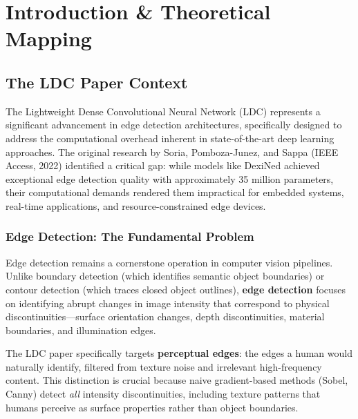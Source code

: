 \documentclass[11pt,a4paper]{report}
\begin{document}

\tableofcontents
\newpage


\chapter{Introduction \& Theoretical Mapping}

\section{The LDC Paper Context}

The Lightweight Dense Convolutional Neural Network (LDC) represents a significant advancement in edge detection architectures, specifically designed to address the computational overhead inherent in state-of-the-art deep learning approaches. The original research by Soria, Pomboza-Junez, and Sappa (IEEE Access, 2022) identified a critical gap: while models like DexiNed achieved exceptional edge detection quality with approximately 35 million parameters, their computational demands rendered them impractical for embedded systems, real-time applications, and resource-constrained edge devices.

\subsection{Edge Detection: The Fundamental Problem}

Edge detection remains a cornerstone operation in computer vision pipelines. Unlike boundary detection (which identifies semantic object boundaries) or contour detection (which traces closed object outlines), \textbf{edge detection} focuses on identifying abrupt changes in image intensity that correspond to physical discontinuities---surface orientation changes, depth discontinuities, material boundaries, and illumination edges.

The LDC paper specifically targets \textbf{perceptual edges}: the edges a human would naturally identify, filtered from texture noise and irrelevant high-frequency content. This distinction is crucial because naive gradient-based methods (Sobel, Canny) detect \textit{all} intensity discontinuities, including texture patterns that humans perceive as surface properties rather than object boundaries.
\end{document}
